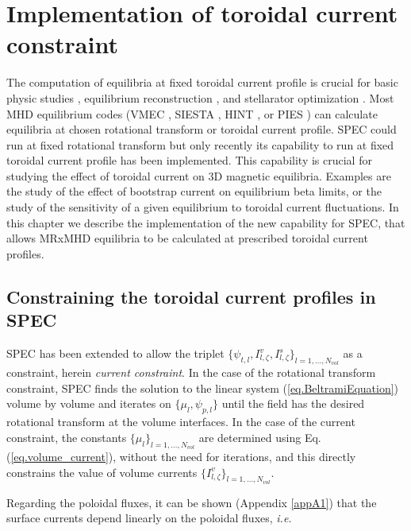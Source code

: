\documentclass[my_thesis.tex]{subfiles}
\begin{document}
\section{Implementation of toroidal current constraint \label{sec. current constraint}}

The computation of equilibria at fixed toroidal current profile is crucial for basic physic studies \citep{Loizu2017,Suzuki2020}, equilibrium reconstruction \citep{Lao1985,Hanson2009}, and stellarator optimization \citep{Geiger2010,Geiger2015}.  Most \ac{MHD} equilibrium codes (VMEC \citep{Hirshman1983,Hirshman1986}, SIESTA \citep{Hirshman2008,Peraza-Rodriguez2017}, HINT \citep{Harafuji1989,Suzuki2006}, or PIES \citep{Reiman1986,Drevlak2005}) can calculate equilibria at chosen rotational transform or toroidal current profile. \ac{SPEC} could run at fixed rotational transform but only recently its capability to run at fixed toroidal current profile has been implemented. This capability is crucial for studying the effect of toroidal current on 3D magnetic equilibria. Examples are the study of the effect of bootstrap current on equilibrium beta limits, or the study of the sensitivity of a given equilibrium to toroidal current fluctuations. In  this  chapter  we describe the implementation of the  new  capability  for  \ac{SPEC}, that allows \ac{MRxMHD} equilibria to be calculated at prescribed toroidal current profiles.
\subsection{Constraining the toroidal current profiles in \ac{SPEC}}

\ac{SPEC} has been extended to allow the triplet $\{\psi_{t,l}, I^v_{l,\zeta}, I^s_{l,\zeta}\}_{l=1,\ldots,N_{vol}}$ as a constraint, herein \textit{current constraint}. In the case of the rotational transform constraint, \ac{SPEC} finds the solution to the linear system (\ref{eq.BeltramiEquation}) volume by volume and iterates on $\{\mu_l, \psi_{p,l}\}$ until the field has the desired rotational transform at the volume interfaces. In the case of the current constraint, the constants $\{\mu_l\}_{l=1,\ldots,N_{vol}}$ are determined using Eq.(\ref{eq.volume_current}), without the need for iterations, and this directly constrains the value of volume currents $\{I^v_{l,\zeta}\}_{l=1,\ldots,N_{vol}}$.

Regarding the poloidal fluxes, it can be shown  (Appendix \ref{appA1}) that the surface currents depend linearly on the poloidal fluxes, \textit{i.e.} 
\end{document}
